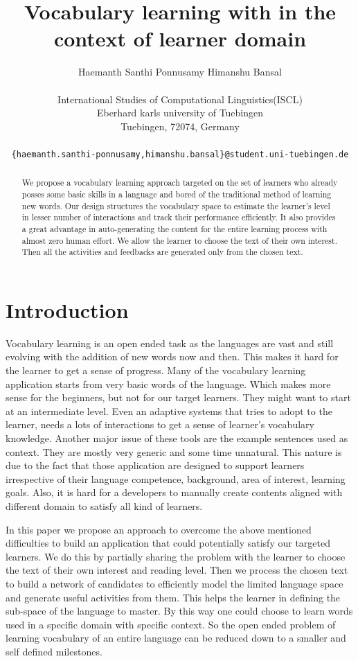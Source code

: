 \documentclass[11pt,a4paper]{article}
\title{Vocabulary learning with in the context of learner domain}
\author{Haemanth Santhi Ponnusamy \qquad Himanshu Bansal \\\\
  International Studies of Computational Linguistics(ISCL) \\
  Eberhard karls university of Tuebingen\\
  Tuebingen, 72074, Germany \\\\ \tt \small \{haemanth.santhi-ponnusamy,himanshu.bansal\}@student.uni-tuebingen.de}
\date{}
\begin{document}
\maketitle
\begin{abstract}
  We propose a vocabulary learning approach targeted on the set of learners
  who already posses some basic skills in a language and bored of the
  traditional method of learning new words. Our design 
  structures the vocabulary space to estimate the learner's
  level in lesser number of interactions and track their performance efficiently.
  It also provides a great advantage in auto-generating the content
  for the entire learning process with almost zero human effort. We allow the
  learner to choose the text of their own interest. Then all the activities and
  feedbacks are generated only from the chosen text.
\end{abstract}

\section{Introduction}
Vocabulary learning is an open ended task as the languages are vast and still
evolving with the addition of new words now and then. This makes it hard for the
learner to get a sense of progress. Many of the vocabulary learning application 
starts from very basic words of the language. Which makes more sense for the 
beginners, but not for our target learners. They might want to start at an intermediate level.
Even an adaptive systems that tries to adopt to the learner, needs a lots of interactions
to get a sense of learner's vocabulary knowledge. Another major issue of these tools are the
example sentences used as context. They are mostly very generic and some time unnatural.
This nature is due to the fact that those application are designed to support learners irrespective of their
language competence, background, area of interest, learning goals. Also, it is
hard for a developers to manually create contents aligned with different domain to satisfy all kind of learners.

In this paper we propose an approach to overcome the above mentioned
difficulties to build an application that could potentially satisfy our targeted
learners. We do this by partially sharing the problem with the learner to choose the 
text of their own interest and reading level. Then we process the chosen text to
build a network of candidates to efficiently model the limited language space and
generate useful activities from them. This helps
the learner in defining the sub-space of the language to master. By this way one
could choose to learn words used in a specific domain with specific context.
So the open ended problem of learning vocabulary of an entire language can be reduced
down to a smaller and self defined milestones.
\end{document}
